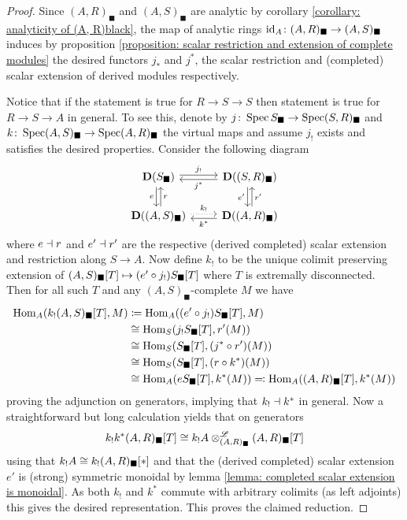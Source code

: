 \begin{proof}
	Since $(A, R)_\blacksquare$ and $(A, S)_\blacksquare$ are analytic by corollary \ref{corollary: analyticity of (A, R)black}, the map of analytic rings $\mathrm{id}_A\colon (A, R)_\blacksquare\to(A, S)_\blacksquare$ induces by proposition \ref{proposition: scalar restriction and extension of complete modules} the desired functors $j_\ast$ and $j^\ast$, the scalar restriction and (completed) scalar extension of derived modules respectively.
	
	Notice that if the statement is true for $R\to S \to S$ then statement is true for $R \to S \to A$ in general. To see this, denote by $j\colon \operatorname{Spec} S_\blacksquare \to \operatorname{Spec} (S, R)_\blacksquare$ and $k\colon \operatorname{Spec} (A, S)_\blacksquare \to \operatorname{Spec} (A, R)_\blacksquare$ the virtual maps and assume $j_!$ exists and satisfies the desired properties. Consider the following diagram
	$$\begin{tikzcd}
		\derived{S_\blacksquare} &\derived{(S, R)_\blacksquare}\\
		\derived{(A, S)_\blacksquare} &\derived{(A, R)_\blacksquare}
		\ar[from=1-1, to=1-2, shift left=0.2em, "j_!"]
		\ar[from=1-2, to=1-1, shift left=0.2em, "j^\ast"]
		\ar[from=2-1, to=2-2, shift left=0.2em, "k_!", dotted]
		\ar[from=2-2, to=2-1, shift left=0.2em, "k^\ast"]
		\ar[from=1-1, to=2-1, shift right=0.2em, "e", swap]
		\ar[from=2-1, to=1-1, shift right=0.2em, "r", swap]
		\ar[from=1-2, to=2-2, shift right=0.2em, "e'", swap]
		\ar[from=2-2, to=1-2, shift right=0.2em, "r'", swap]
	\end{tikzcd}$$
	where $e\dashv r$ and $e'\dashv r'$ are the respective (derived completed) scalar extension and restriction along $S\to A$. Now define $k_!$ to be the unique colimit preserving extension of ${(A, S)_\blacksquare[T]} \mapsto (e'\circ j_!){S_\blacksquare[T]}$ where $T$ is extremally disconnected. Then for all such $T$ and any $(A, S)_\blacksquare$-complete $M$ we have
	\begin{align*}
		{\operatorname{Hom}}_A(k_!{(A, S)_\blacksquare[T]}, M) &\coloneqq {\operatorname{Hom}}_A((e'\circ j_!){S_\blacksquare[T]}, M)\\
		&\cong {\operatorname{Hom}}_S(j_!{S_\blacksquare[T]}, r'(M))\\
		&\cong {\operatorname{Hom}}_S({S_\blacksquare[T]}, (j^\ast \circ r')(M))\\
		&\cong {\operatorname{Hom}}_S({S_\blacksquare[T]}, (r\circ k^\ast)(M))\\
		&\cong {\operatorname{Hom}}_A(e{S_\blacksquare[T]}, k^\ast (M)) \eqqcolon {\operatorname{Hom}}_A({(A, R)_\blacksquare[T]}, k^\ast(M))
	\end{align*}
	proving the adjunction on generators, implying that $k_! \dashv k^\ast$ in general. Now a straightforward but long calculation yields that on generators
		$$k_!k^\ast {(A, R)_\blacksquare[T]} \cong k_! A \otimes^{\mathscr{L}}_{(A, R)_\blacksquare} {(A, R)_\blacksquare[T]}$$
	using that $k_!A \cong k_!{(A, R)_\blacksquare[\ast]}$ and that the (derived completed) scalar extension $e'$ is (strong) symmetric monoidal by lemma \ref{lemma: completed scalar extension is monoidal}. As both $k_!$ and $k^\ast$ commute with arbitrary colimits (as left adjoints) this gives the desired representation. This proves the claimed reduction.


\end{proof}
